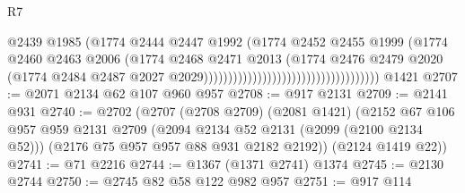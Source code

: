 \begin{lexlean}{R7}
\begin{coremodule}
                                                                @2439
                                                                @1985
                                                                (@1774
                                                                  @2444
                                                                  @2447
                                                                  @1992
                                                                  (@1774
                                                                    @2452
                                                                    @2455
                                                                    @1999
                                                                    (@1774
                                                                      @2460
                                                                      @2463
                                                                      @2006
                                                                      (@1774
                                                                        @2468
                                                                        @2471
                                                                        @2013
                                                                        (@1774
                                                                          @2476
                                                                          @2479
                                                                          @2020
                                                                          (@1774
                                                                            @2484
                                                                            @2487
                                                                            @2027
                                                                            @2029))))))))))))))))))))))))))))))))))))
    @1421
@2707 := @2071 @2134 @62 @107 @960 @957
@2708 := @917 @2131
@2709 := @2141 @931
@2740 := @2702
    (@2707
      (@2708 @2709)
      (@2081 @1421)
      (@2152
        @67
        @106
        @957
        @959
        @2131
        @2709
        (@2094 @2134 @52 @2131 (@2099 (@2100 @2134 @52)))
        (@2176 @75 @957 @957 @88 @931 @2182 @2192))
      (@2124 @1419 @22))
@2741 := @71 @2216
@2744 := @1367 (@1371 @2741) @1374
@2745 := @2130 @2744
@2750 := @2745 @82 @58 @122 @982 @957
@2751 := @917 @114

\end{coremodule}
\end{lexlean}

